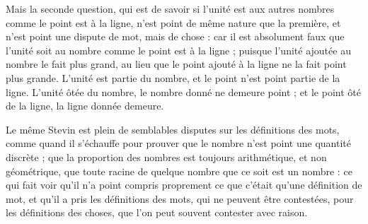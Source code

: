 Mais la seconde question, qui est de savoir si l'unité est aux autres nombres comme le point est à la ligne, n'est point de même nature que la première, et n'est point une dispute de mot, mais de chose : car il est absolument faux que l'unité soit au nombre comme le point est à la ligne ; puisque l'unité ajoutée au nombre le fait plus grand, au lieu que le point ajouté à la ligne ne la fait point plus grande. L'unité est partie du nombre, et le point n'est point partie de la ligne. L'unité ôtée du nombre, le nombre donné ne demeure point ; et le point ôté de la ligne, la ligne donnée demeure.

Le même Stevin est plein de semblables disputes sur les définitions des mots, comme quand il s'échauffe pour prouver que le nombre n'est point une quantité discrète ; que la proportion des nombres est toujours arithmétique, et non géométrique, que toute racine de quelque nombre que ce soit est un nombre : ce qui fait voir qu'il n'a point compris proprement ce que c'était qu'une définition de mot, et qu'il a pris les définitions des mots, qui ne peuvent être contestées, pour les définitions des choses, que l'on peut souvent contester avec raison.



